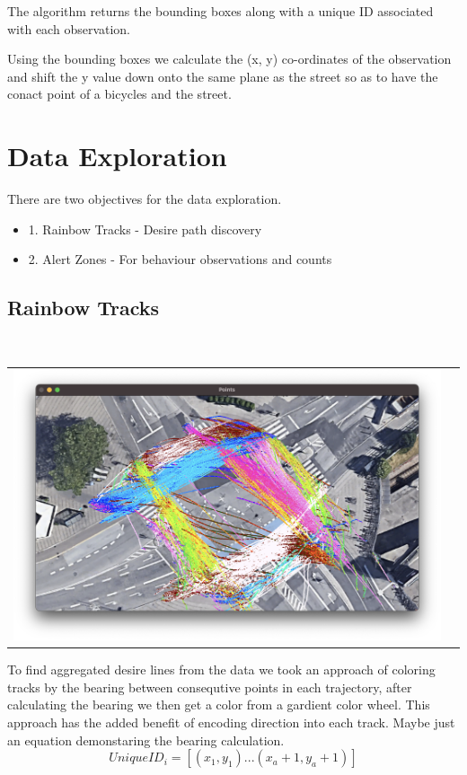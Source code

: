 \documentclass[
10pt, %
a4paper, %
oneside, %
headinclude,footinclude, %
] {book}%
\begin{document}
The algorithm returns the bounding boxes along with a unique ID associated with each observation.

Using the bounding boxes we calculate the (x, y) co-ordinates of the observation and shift the y value down onto 
the same plane as the street so as to have the conact point of a bicycles and the street.

\section{Data Exploration}

There are two objectives for the data exploration.
\begin{itemize}
	\item1. Rainbow Tracks - Desire path discovery
	\item2. Alert Zones - For behaviour observations and counts
\end{itemize}

\subsection{Rainbow Tracks}

\ \\ 
\noindent
\begin{tabular}{@{}cc}
\includegraphics[width=1.0\columnwidth]{rainbow.png} 
\end{tabular}
\label{Rainbow}

To find aggregated desire lines from the data we took an approach of coloring tracks by the bearing between consequtive points in each 
trajectory, after calculating the bearing we then get a color from a gardient color wheel. This approach has the added benefit of encoding direction into 
each track.
Maybe just an equation demonstaring the bearing calculation.
\ \\ 
\begin{equation}
  UniqueID_i = [(x_1, y_1)...(x_a+1, y_a+1)]\label{eq:3}
\end{equation}
\end{document}
